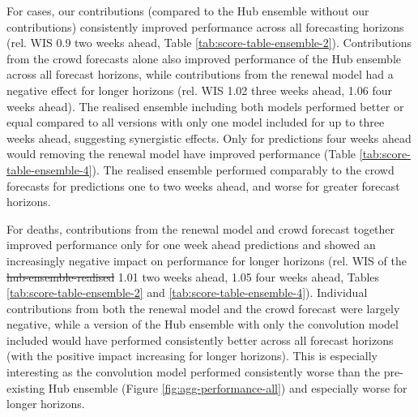 \documentclass[
]{article}
\providecommand{\DIFaddtex}[1]{{\protect\color{blue}\uwave{#1}}} %
\providecommand{\DIFdeltex}[1]{{\protect\color{red}\sout{#1}}}                      %
\providecommand{\DIFaddbegin}{} %
\providecommand{\DIFaddend}{} %
\providecommand{\DIFdelbegin}{} %
\providecommand{\DIFdelend}{} %
\providecommand{\DIFadd}[1]{\texorpdfstring{\DIFaddtex{#1}}{#1}} %
\providecommand{\DIFdel}[1]{\texorpdfstring{\DIFdeltex{#1}}{}} %
\newcommand{\DIFscaledelfig}{0.5}
\newlength{\DIFdelgraphicswidth} %
\newlength{\DIFdelgraphicsheight} %
\newcommand{\DIFaddincludegraphics}[2][]{{\color{blue}\fbox{\DIFOincludegraphics[#1]{#2}}}} %
\newcommand{\DIFdelincludegraphics}[2][]{%
\sbox{\DIFdelgraphicsbox}{\DIFOincludegraphics[#1]{#2}}%
\settoboxwidth{\DIFdelgraphicswidth}{\DIFdelgraphicsbox} %
\settoboxtotalheight{\DIFdelgraphicsheight}{\DIFdelgraphicsbox} %
\scalebox{\DIFscaledelfig}{%
\parbox[b]{\DIFdelgraphicswidth}{\usebox{\DIFdelgraphicsbox}\\[-\baselineskip] \rule{\DIFdelgraphicswidth}{0em}}\llap{\resizebox{\DIFdelgraphicswidth}{\DIFdelgraphicsheight}{%
\setlength{\unitlength}{\DIFdelgraphicswidth}%
\begin{picture}(1,1)%
\thicklines\linethickness{2pt} %
{\color[rgb]{1,0,0}\put(0,0){\framebox(1,1){}}}%
{\color[rgb]{1,0,0}\put(0,0){\line( 1,1){1}}}%
{\color[rgb]{1,0,0}\put(0,1){\line(1,-1){1}}}%
\end{picture}%
}\hspace*{3pt}}} %
} %
\DeclareRobustCommand{\DIFaddbegin}{\DIFOaddbegin \let\includegraphics\DIFaddincludegraphics} %
\DeclareRobustCommand{\DIFaddend}{\DIFOaddend \let\includegraphics\DIFOincludegraphics} %
\DeclareRobustCommand{\DIFdelbegin}{\DIFOdelbegin \let\includegraphics\DIFdelincludegraphics} %
\DeclareRobustCommand{\DIFdelend}{\DIFOaddend \let\includegraphics\DIFOincludegraphics} %
\begin{document}
For cases, our contributions (compared to the Hub ensemble without our contributions) consistently improved performance across all forecasting horizons (rel. WIS 0.9 two weeks ahead, Table \ref{tab:score-table-ensemble-2}). Contributions from the crowd forecasts alone also improved performance of the Hub ensemble across all forecast horizons, while contributions from the renewal model had a negative effect for longer horizons (rel. WIS 1.02 three weeks ahead, 1.06 four weeks ahead). The realised ensemble including both models performed better or equal compared to all versions with only one model included for up to three weeks ahead, suggesting synergistic effects. Only for predictions four weeks ahead would removing the renewal model have improved performance (Table \ref{tab:score-table-ensemble-4}). The realised ensemble performed comparably to the crowd forecasts for predictions one to two weeks ahead, and worse for greater forecast horizons.

For deaths, contributions from the renewal model and crowd forecast together improved performance only for one week ahead predictions and showed an increasingly negative impact on performance for longer horizons (rel. WIS of the \DIFdelbegin \DIFdel{hub-ensemble-realised }\DIFdelend \DIFaddbegin \DIFadd{Hub-ensemble-realised }\DIFaddend 1.01 two weeks ahead, 1.05 four weeks ahead, Tables \ref{tab:score-table-ensemble-2} and \ref{tab:score-table-ensemble-4}). Individual contributions from both the renewal model and the crowd forecast were largely negative, while a version of the Hub ensemble with only the convolution model included would have performed consistently better across all forecast horizons (with the positive impact increasing for longer horizons). This is especially interesting as the convolution model performed consistently worse than the pre-existing Hub ensemble (Figure \ref{fig:agg-performance-all}) and especially worse for longer horizons.
\end{document}
